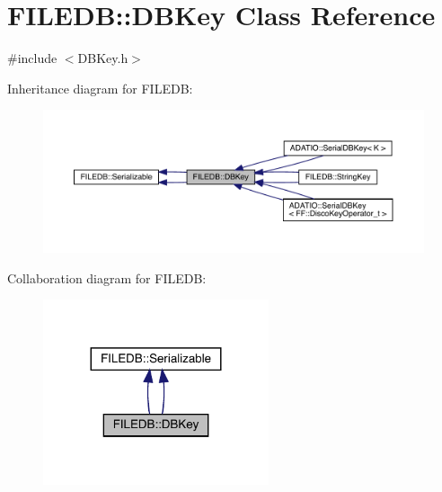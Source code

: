 \hypertarget{classFILEDB_1_1DBKey}{}\section{F\+I\+L\+E\+DB\+:\+:D\+B\+Key Class Reference}
\label{classFILEDB_1_1DBKey}


{\ttfamily \#include $<$D\+B\+Key.\+h$>$}



Inheritance diagram for F\+I\+L\+E\+DB\+:\nopagebreak
\begin{figure}[H]
\begin{center}
\leavevmode
\includegraphics[width=350pt]{d2/d2b/classFILEDB_1_1DBKey__inherit__graph}
\end{center}
\end{figure}


Collaboration diagram for F\+I\+L\+E\+DB\+:\nopagebreak
\begin{figure}[H]
\begin{center}
\leavevmode
\includegraphics[width=188pt]{dc/d28/classFILEDB_1_1DBKey__coll__graph}
\end{center}
\end{figure}

